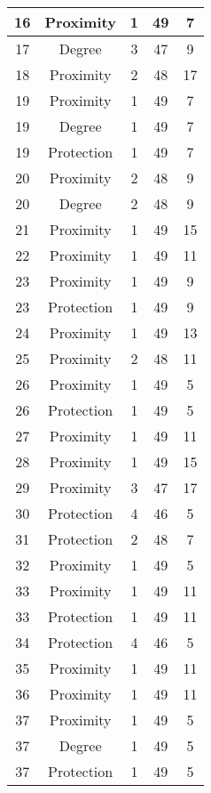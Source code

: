 \documentclass[results.tex]{subfiles}
\begin{document}
\begin{center}
\begin{tabular}{| c || c | c | c | c |}
    \hline
    16 & Proximity & 1 & 49 & 7 \\ 
    \hline
    17 & Degree & 3 & 47 & 9 \\ 
    \hline
    18 & Proximity & 2 & 48 & 17 \\ 
    \hline
    19 & Proximity & 1 & 49 & 7 \\ 
    \hline
    19 & Degree & 1 & 49 & 7 \\ 
    \hline
    19 & Protection & 1 & 49 & 7 \\ 
    \hline
    20 & Proximity & 2 & 48 & 9 \\ 
    \hline
    20 & Degree & 2 & 48 & 9 \\ 
    \hline
    21 & Proximity & 1 & 49 & 15 \\ 
    \hline
    22 & Proximity & 1 & 49 & 11 \\ 
    \hline
    23 & Proximity & 1 & 49 & 9 \\ 
    \hline
    23 & Protection & 1 & 49 & 9 \\ 
    \hline
    24 & Proximity & 1 & 49 & 13 \\ 
    \hline
    25 & Proximity & 2 & 48 & 11 \\ 
    \hline
    26 & Proximity & 1 & 49 & 5 \\ 
    \hline
    26 & Protection & 1 & 49 & 5 \\ 
    \hline
    27 & Proximity & 1 & 49 & 11 \\ 
    \hline
    28 & Proximity & 1 & 49 & 15 \\ 
    \hline
    29 & Proximity & 3 & 47 & 17 \\ 
    \hline
    30 & Protection & 4 & 46 & 5 \\ 
    \hline
    31 & Protection & 2 & 48 & 7 \\ 
    \hline
    32 & Proximity & 1 & 49 & 5 \\ 
    \hline
    33 & Proximity & 1 & 49 & 11 \\ 
    \hline
    33 & Protection & 1 & 49 & 11 \\ 
    \hline
    34 & Protection & 4 & 46 & 5 \\ 
    \hline
    35 & Proximity & 1 & 49 & 11 \\ 
    \hline
    36 & Proximity & 1 & 49 & 11 \\ 
    \hline
    37 & Proximity & 1 & 49 & 5 \\ 
    \hline
    37 & Degree & 1 & 49 & 5 \\ 
    \hline
    37 & Protection & 1 & 49 & 5 \\ 

\end{tabular}
\end{center}
\end{document}

